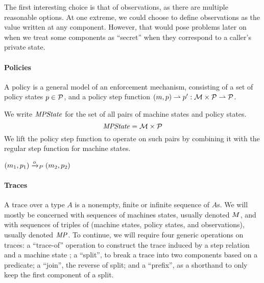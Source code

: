 \documentclass[acmsmall,review,anonymous]{acmart}\settopmatter{printfolios=true,printccs=false,printacmref=false}
\begin{document}
The first interesting choice is that of observations, as there are
multiple reasonable options. At one extreme, we could choose to define
observations as the value written at any component. However, that
would pose problems later on when we treat some components as ``secret''
when they correspond to a caller's private state.   

\paragraph*{Policies}

A policy is a general model of an enforcement mechanism, consisting of
a set of policy states \(p \in \mathcal{P}\), and a policy step function
\((m, p) \rightharpoonup p' : {\mathcal M} \times \mathcal{P}
\rightharpoonup \mathcal{P}\).

We write $\mathit{MPState}$ for the set of all pairs of machine states and policy
states.
%
\[\mathit{MPState} = {\mathcal M} \times \mathcal{P}\]
%
We lift the policy step function to operate on such pairs
by combining it with the regular step function for machine states.

            {\((m_1,p_1) \xrightarrow{o}_P (m_2,p_2)\)}



\paragraph{Traces}

A trace over a type $A$ is a nonempty, finite or infinite
sequence of $A$s. We will mostly be concerned with sequences of
machines states, usually denoted $M$, and with sequences of
triples of (machine states, policy states, and observations), usually
denoted $\mathit{MP}$.
To continue, we will require four generic operations
on traces: a ``trace-of'' operation to construct the
trace induced by a step relation and a machine state
;
a ``split'', to break a
trace into two components based on a predicate; a ``join'', the
reverse of split; and a ``prefix'', as a shorthand to only keep the
first component of a split.  
\end{document}

